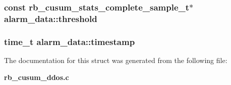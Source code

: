 \subsubsection[{threshold}]{\setlength{\rightskip}{0pt plus 5cm}const {\bf rb\_cusum\_stats\_complete\_sample\_t}$\ast$ alarm\_data\+::threshold}\label{structalarm__data_a77308ac887f5d748203bd308ebf0303a}
\subsubsection[{timestamp}]{\setlength{\rightskip}{0pt plus 5cm}time\_t alarm\_data\+::timestamp}\label{structalarm__data_a25ab9ece11c98c18932eb8ba4451924c}


The documentation for this struct was generated from the following file\+:\begin{DoxyCompactItemize}
\item 
{\bf rb\_cusum\_ddos.\+c}\end{DoxyCompactItemize}
